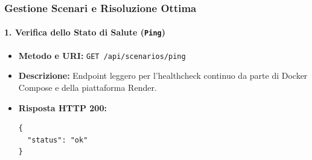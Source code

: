 \subsubsection{Gestione Scenari e Risoluzione Ottima}

\paragraph{1. Verifica dello Stato di Salute (\texttt{Ping})}
\begin{itemize}[leftmargin=1.4em, itemsep=0.1em]
    \item \textbf{Metodo e URI:} \texttt{GET /api/scenarios/ping}
    \item \textbf{Descrizione:} Endpoint leggero per l'healthcheck continuo da parte di Docker Compose e della piattaforma Render.
    \item \textbf{Risposta HTTP 200:}
\begin{lstlisting}
{
  "status": "ok"
}
\end{lstlisting}
\end{itemize}

